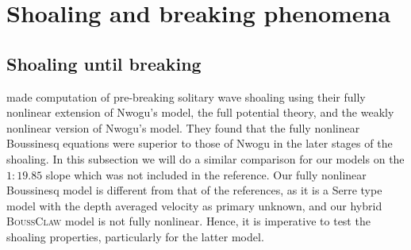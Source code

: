 \documentclass[review]{elsarticle}
\newcommand{\BoussClaw}{\textsc{BoussClaw} }
\begin{document}





\section{Shoaling and breaking phenomena}
\label{sec:shoaling_breaking}

\subsection{Shoaling until breaking}
\label{sec:num_shoaling}
\citet{wei1995fully} made computation of pre-breaking solitary wave shoaling using
 their fully nonlinear extension of Nwogu's model, the full potential 
theory, and the weakly nonlinear version of Nwogu's model.
They found that the fully nonlinear Boussinesq equations were superior to those of Nwogu in the later stages of the shoaling.
In this subsection we will do a similar comparison for our models on the $1:19.85$ slope which was not included in the reference. Our fully nonlinear Boussinesq model is different from that of the references, as it is a Serre type model with the depth averaged velocity as primary unknown, 
and our hybrid \BoussClaw model is not fully nonlinear. Hence, it is imperative
to test the shoaling properties, particularly for the latter model.   
 
\end{document}
